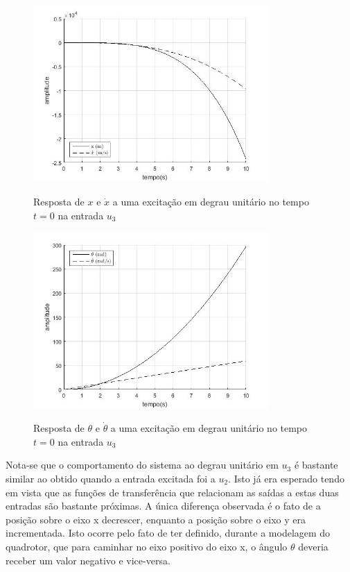 \begin{figure}[!htb]
    \centering
    \caption{Resposta de $x$ e $\dot{x}$ a uma excitação em degrau unitário no tempo $t=0$ na entrada $u_3$}
    \includegraphics[width=0.8\textwidth]{./04-figuras/resultados/malha_aberta/u3_x}
    \label{fig:resultados_malha_aberta_u3_x}
\end{figure}
\begin{figure}[!htb]
    \centering
    \caption{Resposta de $\theta$ e $\dot{\theta}$ a uma excitação em degrau unitário no tempo $t=0$ na entrada $u_3$}
    \includegraphics[width=0.8\textwidth]{./04-figuras/resultados/malha_aberta/u3_theta}
    \label{fig:resultados_malha_aberta_u3_theta}
\end{figure}

Nota-se que o comportamento do sistema ao degrau unitário em $u_3$ é bastante similar ao obtido quando a entrada excitada foi a $u_2$. Isto já era esperado tendo em vista que as funções de transferência que relacionam as saídas a estas duas entradas são bastante próximas. A única diferença observada é o fato de a posição sobre o eixo x decrescer, enquanto a posição sobre o eixo y era incrementada. Isto ocorre pelo fato de  ter definido, durante a modelagem do quadrotor, que para caminhar no eixo positivo do eixo x, o ângulo $\theta$ deveria receber um valor negativo e vice-versa.

